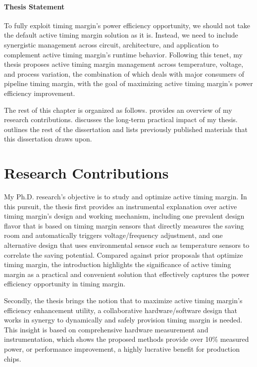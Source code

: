 \paragraph{Thesis Statement} To fully exploit timing margin's power efficiency opportunity, we should not take the default active timing margin solution as it is. Instead, we need to include synergistic management across circuit, architecture, and application to complement active timing margin's runtime behavior. Following this tenet, my thesis proposes active timing margin management across temperature, voltage, and process variation, the combination of which deals with major consumers of pipeline timing margin, with the goal of maximizing active timing margin's power  efficiency improvement.

The rest of this chapter is organized as follows.  provides an overview of my research contributions.  discusses the long-term practical impact of my thesis.  outlines the rest of the dissertation and  lists previously published materials that this dissertation draws upon.

\section{Research Contributions}
\label{sec:intro:work}

My Ph.D. research's objective is to study and optimize active timing margin. In this pursuit, the thesis first provides an instrumental explanation over active timing margin's design and working mechanism, including one prevalent design flavor that is based on timing margin sensors that directly measures the saving room and automatically triggers voltage/frequency adjustment, and one alternative design that uses environmental sensor such as temperature sensors to correlate the saving potential. Compared against prior proposals that optimize timing margin, the introduction highlights the significance of active timing margin as a practical and convenient solution that effectively captures the power efficiency opportunity in timing margin.


Secondly, the thesis brings the notion that to maximize active timing margin's efficiency enhancement utility, a collaborative hardware/software design that works in synergy to dynamically and safely provision timing margin is needed. This insight is based on comprehensive hardware measurement and instrumentation, which shows the proposed methods provide over 10\% measured power, or performance improvement, a highly lucrative benefit for production chips.

